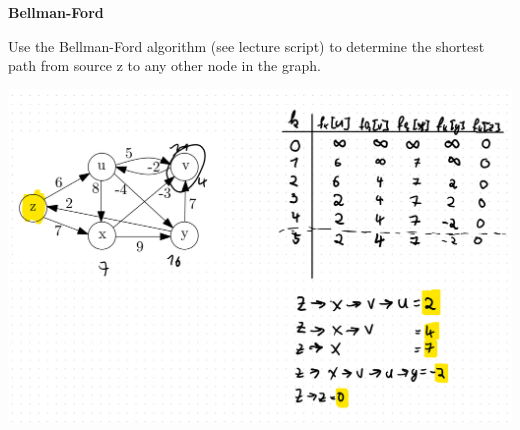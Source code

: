 \question \textbf{Bellman-Ford}

Use the Bellman-Ford algorithm (see lecture script) to determine the shortest path from source z to any other node in the graph.

\begin{solution}

\includegraphics[width=0.8\linewidth]{task_2/sheet09_a2.png}
\end{solution}


